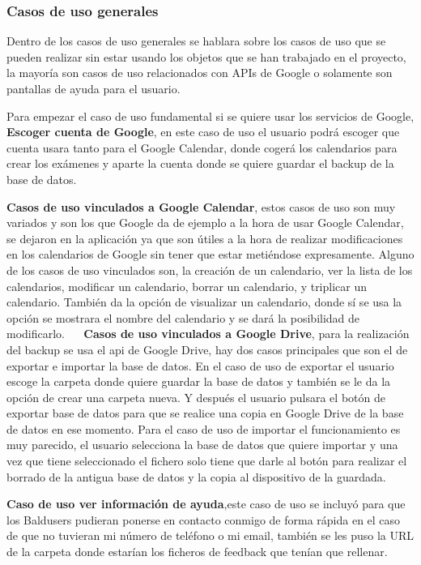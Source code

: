\subsubsection{Casos de uso generales}
\label{subsubsecc:Casos de uso generales}

Dentro de los casos de uso generales se hablara sobre los casos de uso que se pueden realizar sin estar usando los objetos que se han trabajado en el proyecto, la mayoría son casos de uso relacionados con APIs de Google o solamente son pantallas de ayuda para el usuario.

Para empezar el caso de uso fundamental si se quiere usar los servicios de Google, \textbf{Escoger cuenta de Google}, en este caso de uso el usuario podrá escoger que cuenta usara tanto para el Google Calendar, donde cogerá los calendarios para crear los exámenes y aparte la cuenta donde se quiere guardar el backup de la base de datos.

\textbf{Casos de uso vinculados a Google Calendar}, estos casos de uso son muy variados y son los que Google da de ejemplo a la hora de usar Google Calendar, se dejaron en la aplicación ya que son útiles a la hora de realizar modificaciones en los calendarios de Google sin tener que estar metiéndose expresamente.
Alguno de los casos de uso vinculados son, la creación de un calendario, ver la lista de los calendarios, modificar un calendario, borrar un calendario, y triplicar un calendario. También da la opción de visualizar un calendario, donde sí se usa la opción se mostrara el nombre del calendario y se dará la posibilidad de modificarlo.
 
\textbf{Casos de uso vinculados a Google Drive}, para la realización del backup se usa el api de Google Drive, hay dos casos principales que son el de exportar e importar la base de datos.
En el caso de uso de exportar el usuario escoge la carpeta donde quiere guardar la base de datos y también se le da la opción de crear una carpeta nueva.
Y después el usuario pulsara el botón de exportar base de datos para que se realice una copia en Google Drive de la base de datos en ese momento.
Para el caso de uso de importar el funcionamiento es muy parecido, el usuario selecciona la base de datos que quiere importar y una vez que tiene seleccionado el fichero solo tiene que darle al botón para realizar el borrado de la antigua base de datos y la copia al dispositivo de la guardada.

\textbf{Caso de uso ver información de ayuda},este caso de uso se incluyó para que los Baldusers pudieran ponerse en contacto conmigo de forma rápida en el caso de que no tuvieran mi número de teléfono o mi email, también se les puso la URL de la carpeta donde estarían los ficheros de feedback que tenían que rellenar.

